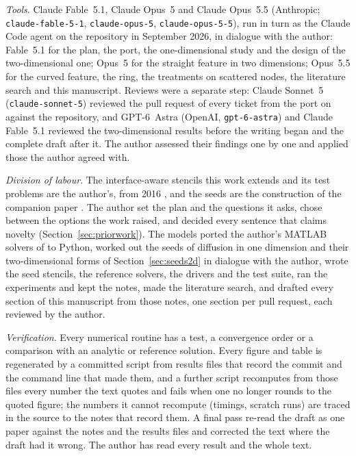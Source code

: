 \documentclass[11pt]{amsart}
\theoremstyle{definition}
\theoremstyle{remark}
\newcommand{\para}[1]{\par\smallskip\noindent\textit{#1}.\enspace}
\begin{document}
\para{Tools}
Claude Fable~5.1, Claude Opus~5 and Claude Opus~5.5 (Anthropic;
\texttt{claude-fable-5-1}, \texttt{claude-opus-5}, \texttt{claude-opus-5-5}),
run in turn as the Claude Code agent on the repository in September 2026,
in dialogue with the author: Fable~5.1 for the plan, the port, the
one-dimensional study and the design of the two-dimensional one; Opus~5 for
the straight feature in two dimensions; Opus~5.5 for the curved feature,
the ring, the treatments on scattered nodes, the literature search and this
manuscript. Reviews were a separate step: Claude Sonnet~5
(\texttt{claude-sonnet-5}) reviewed the pull request of every ticket from
the port on against the repository, and GPT-6~Astra (OpenAI,
\texttt{gpt-6-astra}) and Claude Fable~5.1 reviewed the two-dimensional
results before the writing began and the complete draft after it. The author assessed their findings
one by one and applied those the author agreed with.

\para{Division of labour}
The interface-aware stencils this work extends and its test problems are
the author's, from 2016 \cite{Martin2016,MartinFornberg2017heat}, and the
seeds are the construction of the companion paper \cite{Martin2026seeds}.
The author set the plan and the questions it asks, chose between the
options the work raised, and decided every sentence that claims novelty
(Section~\ref{sec:priorwork}). The models ported the author's MATLAB
solvers of \cite{Martin2016} to Python, worked out the seeds of diffusion
in one dimension and their two-dimensional forms of
Section~\ref{sec:seeds2d} in dialogue with the author, wrote the seed
stencils, the reference solvers, the drivers and the test suite, ran the
experiments and kept the notes, made the literature search, and drafted
every section of this manuscript from those notes, one section per pull
request, each reviewed by the author.

\para{Verification}
Every numerical routine has a test, a convergence order or a comparison
with an analytic or reference solution. Every figure and table is
regenerated by a committed script from results files that record the
commit and the command line that made them, and a further script
recomputes from those files every number the text quotes and fails when
one no longer rounds to the quoted figure; the numbers it cannot recompute
(timings, scratch runs) are traced in the source to the notes that record
them. A final pass re-read the draft as one paper against the notes and
the results files and corrected the text where the draft had it wrong.
The author has read every result and the whole text.
\end{document}
